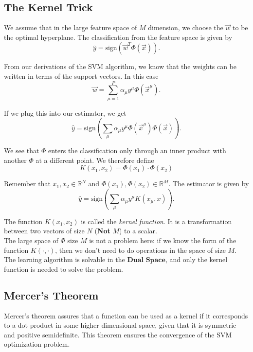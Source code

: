 \documentclass[11pt]{book} %
\begin{document}
\subsection{The Kernel Trick}

We assume that in the large feature space of \( M \) dimension, we choose the \( \vec{w} \) to be the optimal hyperplane. 
The classification from the feature space is given by
\begin{equation}
    \hat{y} = \text{sign}(\vec{w}^T \Phi(\vec{x})).
\end{equation}

From our derivations of the SVM algorithm, we know that the weights can be written in terms of the support vectors. In this case
\begin{equation}
    \vec{w} = \sum_{\mu=1}^{P} \alpha_{\mu} y^{\mu} \Phi(\vec{x}^{\mu}).
\end{equation}

If we plug this into our estimator, we get
\begin{equation}
    \hat{y} = \text{sign} \left( \sum_{\mu} \alpha_{\mu} y^{\mu} \Phi(\vec{x}^{\mu}) \Phi(\vec{x}) \right).
\end{equation}

We see that \( \Phi \) enters the classification only through an inner product with another \( \Phi \) at a different point. We therefore define
\begin{equation}
    K(x_1, x_2) = \Phi(x_1) \cdot \Phi(x_2)
\end{equation}

Remember that \( x_1, x_2 \in \mathbb{R}^N \) and \( \Phi(x_1), \Phi(x_2) \in \mathbb{R}^M \). The estimator is given by
\begin{equation}
    \hat{y} = \text{sign} \left( \sum_{\mu} \alpha_{\mu} y^{\mu} K(x_{\mu}, x) \right).
\end{equation}

The function \( K(x_1, x_2) \) is called the \textit{kernel function}. 
It is a transformation between two vectors of size \( N \) (\textbf{Not} \( M \)) to a scalar. \\
The large space of \( \Phi \) size \( M \) is not a problem here: if we know the form of the function \( K(\cdot, \cdot) \), 
then we don't need to do operations in the space of size \( M \).
The learning algorithm is solvable in the $\textbf{Dual Space}$, and only the kernel function is needed to solve the problem.

\subsection{Mercer's Theorem}
Mercer's theorem assures that a function can be used as a kernel if it corresponds to a dot product in some higher-dimensional space, 
given that it is symmetric and positive semidefinite. This theorem ensures the convergence of the SVM optimization problem.
\end{document}
